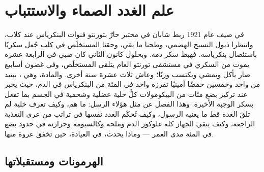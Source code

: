 \chapter{علم الغدد الصماء والاستتباب}\label{ch:b3:endocrinology}

في صيف عام 1921 ربط شابان في مختبر حارّ بتورنتو قنوات
البنكرياس عند كلاب، وانتظرا ذبول النسيج الهضمي، وطحنا ما
بقي، وحقنا المستخلَص في كلب جُعل سكريًا باستئصال بنكرياسه.
فهبط سكر دمه. وبحلول كانون الثاني كان صبي في الرابعة عشرة
يموت من السكري في مستشفى تورنتو العام يتلقى المستخلَص، وفي
غضون أسابيع صار يأكل ويمشي ويكتسب وزنًا؛ وعاش ثلاث عشرة سنة
أخرى. والمادة، وهي ، ببتيد من واحد وخمسين حمضًا
أمينيًا تفرزه واحد في المئة من البنكرياس في الدم، حيث يخبر
عند تركيز بضع مئات من البيكومولات كلَّ خلية عضلية وشحمية في
الجسم بما تفعل بسكر الوجبة الأخيرة. وهذا الفصل عن مثل هؤلاء
الرسل: ما هم، وكيف تعرف خلية لم تلقَ الغدة قط ما يعنيه
الرسول، وكيف تُحكَم الغدد نفسها في تراتب من عرى التغذية
الراجعة، وكيف يبقي الجهاز كله غلوكوز الدم وملحه وكالسيومه
وحرارته في حدود بضع في المئة مدى العمر --- وماذا يحدث، في
العيادة، حين تخفق عروة منها.

\section{الهرمونات ومستقبلاتها}

